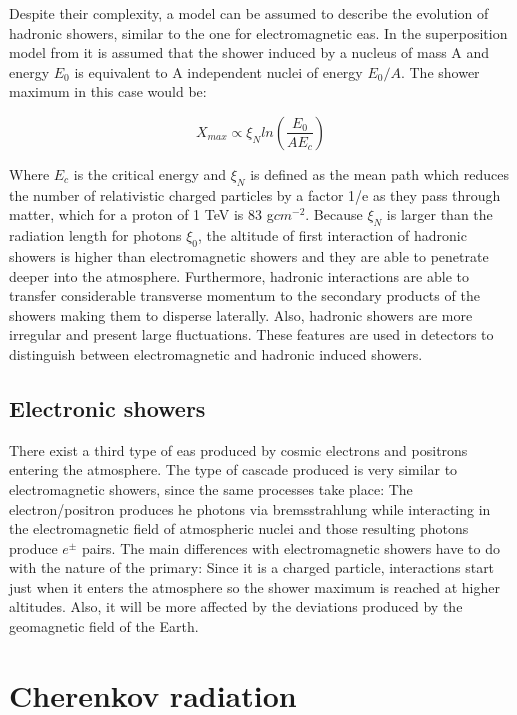 \documentclass[main.tex]{subfiles}
\begin{document}
Despite their complexity, a model can be assumed to describe the evolution of hadronic showers, similar to the one for electromagnetic \gls{eas}. In the superposition model from \cite{2016GaisserCRandParticlePhy} it is assumed that the shower induced by a nucleus of mass A and energy $E_0$ is equivalent to A independent nuclei of energy $E_0/A$. The shower maximum in this case would be:

\begin{equation}
    X_{max} \propto \xi_{N} ln \left( \frac{E_0}{AE_c}\right)
\end{equation}

Where $E_c$ is the critical energy and $\xi_{N}$ is defined as the mean path which reduces the number of relativistic charged  particles by a factor 1/e as they pass through matter, which for a proton of 1 TeV is 83 g$cm^{-2}$. Because $\xi_{N}$ is larger than the radiation length for photons $\xi_{0}$, the altitude of first interaction of hadronic showers is higher than electromagnetic showers and they are able to penetrate deeper into the atmosphere. 
Furthermore, hadronic interactions are able to transfer considerable transverse momentum to the secondary products of the showers making them to disperse laterally. Also, hadronic showers are more irregular and present large fluctuations. These features are used in detectors to distinguish between electromagnetic and hadronic induced showers.

\subsection{Electronic showers}

There exist a third type of \gls{eas} produced by cosmic electrons and positrons entering the atmosphere. The type of cascade produced is very similar to electromagnetic showers, since the same processes take place: The electron/positron produces \gls{he} photons via bremsstrahlung while interacting in the electromagnetic field of atmospheric nuclei and those resulting photons produce $e^{\pm}$ pairs. The main differences with electromagnetic showers have to do with the nature of the primary: Since it is a charged particle, interactions start just when it enters the atmosphere so the shower maximum is reached at higher altitudes. Also, it will be more affected by the deviations produced by the geomagnetic field of the Earth.  

\section{Cherenkov radiation}\label{sec:cherenkov}
\end{document}
